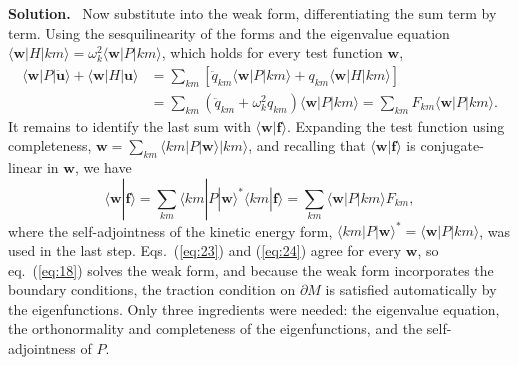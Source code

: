 \documentclass[a4paper,12pt]{paper}
\newenvironment{solution}{\par\noindent\textbf{Solution.}\ }{\par\medskip}
\begin{document}
\begin{solution}
Now substitute into the weak form, differentiating the sum term by term. Using the sesquilinearity of
the forms and the eigenvalue equation
$\langle\mathbf{w}|H|km\rangle=\omega_{k}^{2}\langle\mathbf{w}|P|km\rangle$, which holds for every test
function $\mathbf{w}$,
\begin{align}
\langle\mathbf{w}|P|\ddot{\mathbf{u}}\rangle+\langle\mathbf{w}|H|\mathbf{u}\rangle
&=\sum_{km}\left[\ddot{q}_{km}\langle\mathbf{w}|P|km\rangle+q_{km}\langle\mathbf{w}|H|km\rangle\right]\nonumber\\
&=\sum_{km}\left(\ddot{q}_{km}+\omega_{k}^{2}q_{km}\right)\langle\mathbf{w}|P|km\rangle
=\sum_{km}F_{km}\langle\mathbf{w}|P|km\rangle.
\label{eq:23}
\end{align}
It remains to identify the last sum with $\langle\mathbf{w}|\mathbf{f}\rangle$. Expanding the test
function using completeness, $\mathbf{w}=\sum_{km}\langle km|P|\mathbf{w}\rangle|km\rangle$, and
recalling that $\langle\mathbf{w}|\mathbf{f}\rangle$ is conjugate-linear in $\mathbf{w}$, we have
\begin{equation}
\langle\mathbf{w}|\mathbf{f}\rangle=\sum_{km}\langle km|P|\mathbf{w}\rangle^{*}\langle km|\mathbf{f}\rangle
=\sum_{km}\langle\mathbf{w}|P|km\rangle F_{km},
\label{eq:24}
\end{equation}
where the self-adjointness of the kinetic energy form,
$\langle km|P|\mathbf{w}\rangle^{*}=\langle\mathbf{w}|P|km\rangle$, was used in the last step.
Eqs.~(\ref{eq:23}) and (\ref{eq:24}) agree for every $\mathbf{w}$, so eq.~(\ref{eq:18}) solves the
weak form, and because the weak form incorporates the boundary conditions, the traction condition on
$\partial M$ is satisfied automatically by the eigenfunctions. Only three ingredients were needed:
the eigenvalue equation, the orthonormality and completeness of the eigenfunctions, and the
self-adjointness of $P$.


\end{solution}
\end{document}
